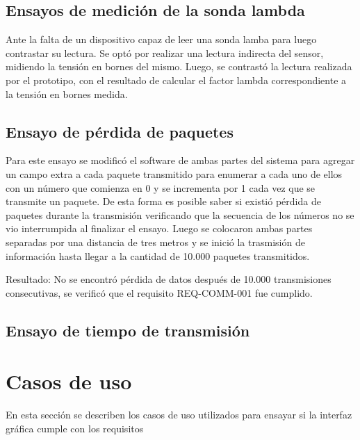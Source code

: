 \subsection{Ensayos de medición de la sonda lambda}

Ante la falta de un dispositivo capaz de leer una sonda lamba para luego contrastar su lectura. Se optó por realizar una lectura indirecta del sensor, midiendo la tensión en bornes del mismo. Luego, se contrastó la lectura realizada por el prototipo, con el resultado de calcular el factor lambda correspondiente a la tensión en bornes medida.

\subsection{Ensayo de pérdida de paquetes}

Para este ensayo se modificó el software de ambas partes del sistema para agregar un campo extra a cada paquete transmitido para enumerar a cada uno de ellos con un número que comienza en 0 y se incrementa por 1 cada vez que se transmite un paquete. De esta forma es posible saber si existió pérdida de paquetes durante la transmisión verificando que la secuencia de los números no se vio interrumpida al finalizar el ensayo. Luego se colocaron ambas partes separadas por una distancia de tres metros y se inició la trasmisión de información hasta llegar a la cantidad de 10.000 paquetes transmitidos. 

Resultado: No se encontró pérdida de datos después de 10.000 transmisiones consecutivas, se verificó que el requisito REQ-COMM-001 fue cumplido.

\subsection{Ensayo de tiempo de transmisión}


\section{Casos de uso}

En esta sección se describen los casos de uso utilizados para ensayar si la interfaz gráfica cumple con los requisitos

